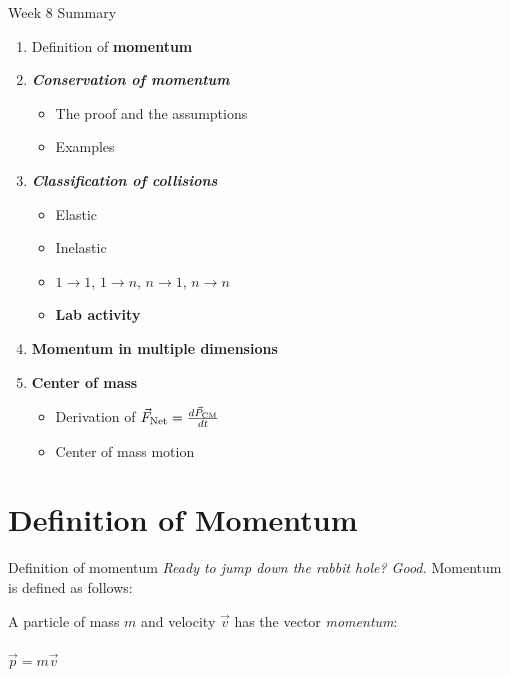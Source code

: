 \documentclass{beamer}
\begin{document}
\begin{frame}{Week 8 Summary}
\begin{enumerate}
\item Definition of \alert{\textbf{momentum}}
\item \alert{\textbf{\textit{Conservation of momentum}}}
\begin{itemize}
\item The proof and the assumptions
\item Examples
\end{itemize}
\item \alert{\textbf{\textit{Classification of collisions}}}
\begin{itemize}
\item Elastic
\item Inelastic
\item $1 \rightarrow 1$, $1 \rightarrow n$, $n \rightarrow 1$, $n \rightarrow n$
\item \textbf{Lab activity}
\end{itemize}
\item \textbf{Momentum in multiple dimensions}
\item \textbf{Center of mass}
\begin{itemize}
\item Derivation of $\vec{F}_{\rm Net} = \frac{d\vec{P}_{\rm CM}}{dt}$
\item Center of mass motion
\end{itemize}
\end{enumerate}
\end{frame}

\section{Definition of Momentum}

\begin{frame}{Definition of momentum}
\textit{Ready to jump down the rabbit hole?  Good.}  Momentum is defined as follows: \\ \vspace{1cm}
\begin{tcolorbox}[colback=white,colframe=red!40!blue,title=Definition of Momentum]
\alert{A particle of mass $m$ and velocity $\vec{v}$ has the vector \textit{momentum}:} \\ \\
\alert{$\vec{p} = m\vec{v}$}
\end{tcolorbox}
\end{frame}
\end{document}
